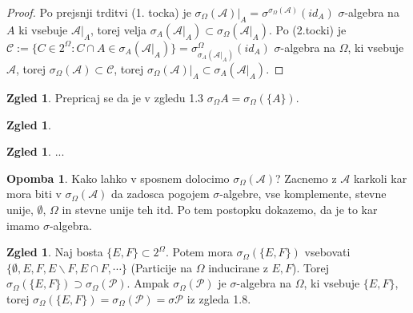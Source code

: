 \documentclass[a4paper,12pt]{article}
\theoremstyle{definition} %
\newtheorem{zgled}[definicija]{Zgled}
\newtheorem{opomba}[definicija]{Opomba}
\theoremstyle{plain} %
\newcommand{\A}{\mathcal{A}}
\begin{document}
            \begin{proof}
                Po prejsnji trditvi (1. tocka) je $\sigma_\Omega(\A)|_A = \sigma^{\sigma_\Omega(\A)}(id_A)$ $\sigma$-algebra na $A$ ki vsebuje $\A|_A$, torej velja $\sigma_A(\A|_A) \subset \sigma_\Omega(\A|_A).$ Po (2.tocki) je $\mathcal{C} := \{ C \in 2^\Omega: C \cap A \in \sigma_A(\A|_A)\} = \sigma_{\sigma_A(\A|_A)}^\Omega(id_A)$ $\sigma$-algebra na $\Omega$, ki vsebuje $\A$, torej $\sigma_\Omega(\A) \subset \mathcal{C}$, torej $\sigma_\Omega(\A)|_A \subset \sigma_A(\A|_A).$

            \end{proof}

            \begin{zgled}
                Prepricaj se da je v zgledu 1.3 $\sigma_\Omega A = \sigma_\Omega(\{A\}).$
            \end{zgled}

            \begin{zgled}
                 
            \end{zgled}

            \begin{zgled}
                ...
            \end{zgled}

            \begin{opomba}
                Kako lahko v sposnem dolocimo $\sigma_\Omega(\A)$? Zacnemo z $\A$ karkoli kar mora biti v $\sigma_\Omega(\A)$ da zadosca pogojem $\sigma$-algebre, vse komplemente, stevne unije, $\emptyset$, $\Omega$ in stevne unije teh itd. Po tem postopku dokazemo, da je to kar imamo $\sigma$-algebra.
            \end{opomba}

            \begin{zgled}
                Naj bosta $\{E, F\} \subset 2^\Omega.$ Potem mora $\sigma_\Omega(\{E, F\})$ vsebovati $\{\emptyset, E, F, E\backslash F, E \cap F, \cdots\}$ (Particije na $\Omega$ inducirane z $E, F$). Torej $\sigma_\Omega(\{E, F\}) \supset \sigma_{\Omega}(\mathcal{P})$. Ampak $\sigma_{\Omega}(\mathcal{P})$ je $\sigma$-algebra na $\Omega$, ki vsebuje $\{E, F\}$, torej $\sigma_\Omega(\{E, F\}) = \sigma_{\Omega}(\mathcal{P}) = \sigma\mathcal{P}$ iz zgleda 1.8.
            \end{zgled}
\end{document}
